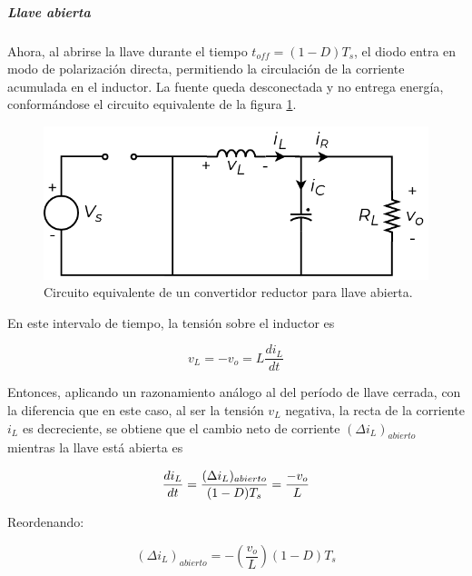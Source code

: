 \subparagraph{Llave abierta}

Ahora, al abrirse la llave durante el tiempo $t_{off} = (1-D)T_s$, el diodo entra en modo de polarización directa, permitiendo la circulación de la corriente acumulada en el inductor. La fuente queda desconectada y no entrega energía, conformándose el circuito equivalente de la figura \ref{reductor_llave_abierta}.\\

\begin{figure}[H]
    \centering
    \includegraphics[scale=0.6]{Imagenes/Reductor Llave Abierta.pdf}
    \caption{Circuito equivalente de un convertidor reductor para llave abierta.}
    \label{reductor_llave_abierta}
\end{figure}

En este intervalo de tiempo, la tensión sobre el inductor es

\begin{equation}\label{ec_tensionL_abierta}
    v_L = -v_o = L\frac{di_L}{dt}
\end{equation}

Entonces, aplicando un razonamiento análogo al del período de llave cerrada, con la diferencia que en este caso, al ser la tensión $v_L$ negativa, la recta de la corriente $i_L$ es decreciente, se obtiene que el cambio neto de corriente $(\Delta i_L)_{abierto}$ mientras la llave está abierta es

\begin{equation*}
    \frac{di_L}{dt} = \frac{(\Delta i_L)_{abierto}}{(1-D)T_s} = \frac{-v_o}{L}\\
\end{equation*}

Reordenando:

\begin{equation}\label{deltaiL_abierta}
    \boxed{
        (\Delta i_L)_{abierto} = -\left(\frac{v_o}{L}\right)(1-D)T_s
    }
\end{equation}

